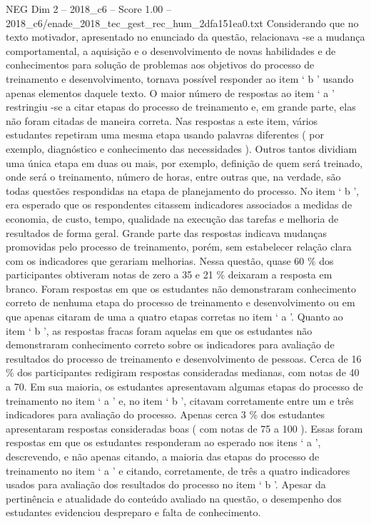 \begin{textsample}{NEG Dim 2 – 2018\_c6 – Score 1.00 – 2018\_c6/enade\_2018\_tec\_gest\_rec\_hum\_2dfa151ea0.txt}
Considerando que no texto motivador, apresentado no enunciado da questão, relacionava -se a mudança comportamental, a aquisição e o desenvolvimento de novas habilidades e de conhecimentos para solução de problemas aos objetivos do processo de treinamento e desenvolvimento, tornava possível responder ao item ‘ b ’ usando apenas elementos daquele texto.
O maior número de respostas ao item ‘ a ’ restringiu -se a citar etapas do processo de treinamento e, em grande parte, elas não foram citadas de maneira correta.
Nas respostas a este item, vários estudantes repetiram uma mesma etapa usando palavras diferentes ( por exemplo, diagnóstico e conhecimento das necessidades ).
Outros tantos dividiam uma única etapa em duas ou mais, por exemplo, definição de quem será treinado, onde será o treinamento, número de horas, entre outras que, na verdade, são todas questões respondidas na etapa de planejamento do processo.
No item ‘ b ’, era esperado que os respondentes citassem indicadores associados a medidas de economia, de custo, tempo, qualidade na execução das tarefas e melhoria de resultados de forma geral.
Grande parte das respostas indicava mudanças promovidas pelo processo de treinamento, porém, sem estabelecer relação clara com os indicadores que gerariam melhorias.
Nessa questão, quase 60 \% dos participantes obtiveram notas de zero a 35 e 21 \% deixaram a resposta em branco.
Foram respostas em que os estudantes não demonstraram conhecimento correto de nenhuma etapa do processo de treinamento e desenvolvimento ou em que apenas citaram de uma a quatro etapas corretas no item ‘ a ’.
Quanto ao item ‘ b ’, as respostas fracas foram aquelas em que os estudantes não demonstraram conhecimento correto sobre os indicadores para avaliação de resultados do processo de treinamento e desenvolvimento de pessoas.
Cerca de 16 \% dos participantes redigiram respostas consideradas medianas, com notas de 40 a 70.
Em sua maioria, os estudantes apresentavam algumas etapas do processo de treinamento no item ‘ a ’ e, no item ‘ b ’, citavam corretamente entre um e três indicadores para avaliação do processo.
Apenas cerca 3 \% dos estudantes apresentaram respostas consideradas boas ( com notas de 75 a 100 ).
Essas foram respostas em que os estudantes responderam ao esperado nos itens ‘ a ’, descrevendo, e não apenas citando, a maioria das etapas do processo de treinamento no item ‘ a ’ e citando, corretamente, de três a quatro indicadores usados para avaliação dos resultados do processo no item ‘ b ’.
Apesar da pertinência e atualidade do conteúdo avaliado na questão, o desempenho dos estudantes evidenciou despreparo e falta de conhecimento.

\end{textsample}
